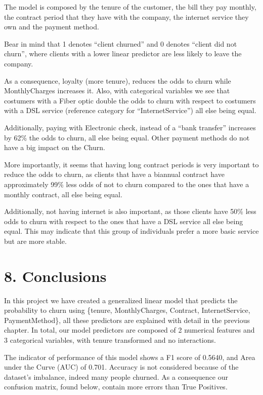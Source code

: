 \documentclass[
]{article}
\begin{document}
The model is composed by the tenure of the customer, the bill they pay
monthly, the contract period that they have with the company, the
internet service they own and the payment method.

Bear in mind that 1 denotes ``client churned'' and 0 denotes ``client
did not churn'', where clients with a lower linear predictor are less
likely to leave the company.

As a consequence, loyalty (more tenure), reduces the odds to churn while
MonthlyCharges increases it. Also, with categorical variables we see
that costumers with a Fiber optic double the odds to churn with respect
to costumers with a DSL service (reference category for
``InternetService'') all else being equal.

Additionally, paying with Electronic check, instead of a ``bank
transfer'' increases by 62\% the odds to churn, all else being equal.
Other payment methods do not have a big impact on the Churn.

More importantly, it seems that having long contract periods is very
important to reduce the odds to churn, as clients that have a biannual
contract have approximately 99\% less odds of not to churn compared to
the ones that have a monthly contract, all else being equal.

Additionally, not having internet is also important, as those clients
have 50\% less odds to churn with respect to the ones that have a DSL
service all else being equal. This may indicate that this group of
individuals prefer a more basic service but are more stable.

\hypertarget{conclusions}{%
\section{8. Conclusions}\label{conclusions}}

In this project we have created a generalized linear model that predicts
the probability to churn using \{tenure, MonthlyCharges, Contract,
InternetService, PaymentMethod\}, all these predictors are explained
with detail in the previous chapter. In total, our model predictors are
composed of 2 numerical features and 3 categorical variables, with
tenure transformed and no interactions.

The indicator of performance of this model shows a F1 score of 0.5640,
and Area under the Curve (AUC) of 0.701. Accuracy is not considered
because of the dataset's imbalance, indeed many people churned. As a
consequence our confusion matrix, found below, contain more errors than
True Positives.
\end{document}
